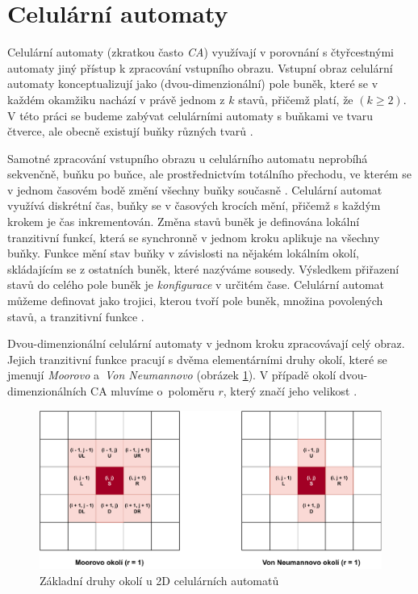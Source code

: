 \section{Celulární automaty}

Celulární automaty (zkratkou často \emph{CA}) využívají v porovnání s čtyřcestnými automaty jiný přístup k zpracování vstupního obrazu. Vstupní obraz celulární automaty konceptualizují jako (dvou-dimenzionální) pole buněk, které se v každém okamžiku nachází v právě jednom z $k$ stavů, přičemž platí, že $(k \geq 2)$. V této práci se budeme zabývat celulárními automaty s buňkami ve tvaru čtverce, ale obecně existují buňky různých tvarů \cite{CATheory}. 

Samotné zpracování vstupního obrazu u celulárního automatu neprobíhá sekvenčně, buňku po buňce, ale prostřednictvím totálního přechodu, ve kterém se v jednom časovém bodě změní všechny buňky současně \cite{RozenbergGrzegorz1997HoFL}. Celulární automat využívá diskrétní čas, buňky se v časových krocích mění, přičemž s každým krokem je čas inkrementován. Změna stavů buněk je definována lokální tranzitivní funkcí, která se synchronně v jednom kroku aplikuje na všechny buňky. Funkce mění stav buňky v závislosti na nějakém lokálním okolí, skládajícím se z ostatních buněk, které nazýváme sousedy. Výsledkem přiřazení stavů do celého pole buněk je \emph{konfigurace} v určitém čase. Celulární automat můžeme definovat jako trojici, kterou tvoří pole buněk, množina povolených stavů, a tranzitivní funkce \cite{CATheory}.

Dvou-dimenzionální celulární automaty v jednom kroku zpracovávají celý obraz. Jejich tranzitivní funkce pracují s dvěma elementárními druhy okolí, které se jmenují \emph{Moorovo} a~\emph{Von Neumannovo} (obrázek \ref{fig:CAOkoli}). V případě okolí dvou-dimenzionálních CA mluvíme o~poloměru $r$, který značí jeho velikost \cite{CATheory}. 

\begin{figure}[H]
    \centering
    \includegraphics[width=\textwidth]{obrazky-figures/CAOkoli.pdf}
    \caption{Základní druhy okolí u 2D celulárních automatů}
    \label{fig:CAOkoli}
\end{figure}


